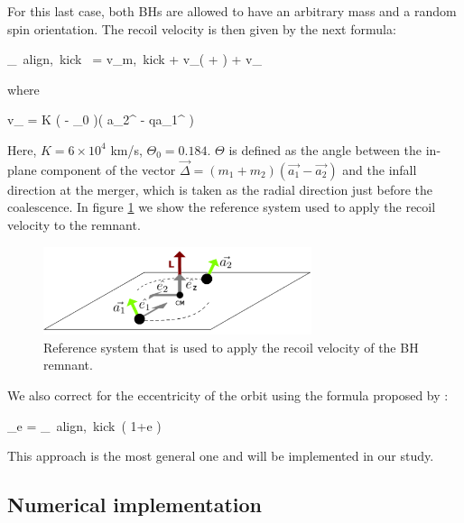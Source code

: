 \documentclass[a4,useAMS,usenatbib,usegraphicx,12pt]{article}
\begin{document}
For this last case, both BHs are allowed to have an arbitrary mass and a random spin orientation. 
The recoil velocity is then given by the next formula:

{ _{\mbox{\tiny{ align, kick }}} = v_{\mbox{\tiny{m, kick}}}  + 
v_{\bot}( \cos{\xi} + \sin{\xi} ) + v_{\parallel} }

where

{ v_{\parallel} = K \cos( \Theta - \Theta_0 )( a_2^{\bot} - qa_1^{\bot} ) }

Here, $K = 6\times 10^4$ km/s, $\Theta_0 = 0.184$. $\Theta$ is defined as the angle between 
the in-plane component of the vector $\vec{\Delta} = (m_1+m_2)(\vec{a_1}-\vec{a_2})$ and the infall 
direction at the merger, which is taken as the radial direction just before the coalescence. In figure
\ref{fig:RecoilReferenceSystem} we show the reference system used to apply the recoil velocity to the
remnant.

\begin{figure}[htbp]
\centering
\includegraphics[width=0.7\textwidth]
{./figures/BinarySystem.png}
\caption{\small{Reference system that is used to apply the recoil velocity of the BH remnant.}}

\label{fig:RecoilReferenceSystem}
\end{figure}

We also correct for the eccentricity of the orbit using the formula proposed by \citep{Sopuerta2007}:

{ _{e} = _{\mbox{\tiny{ align, kick }}}( 1+e ) }

This approach is the most general one and will be implemented in our study.


\subsection{Numerical implementation}
\end{document}
